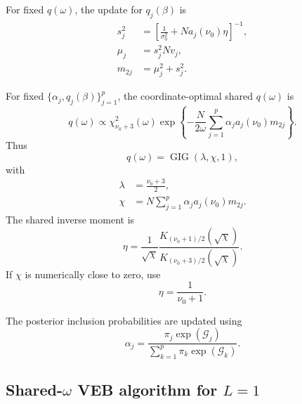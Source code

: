 \documentclass[11pt]{article}
\newcommand{\nuo}{\nu_0}
\newcommand{\sigb}{\sigma_0^2}
\newcommand{\GIG}{\operatorname{GIG}}
\newcommand{\chisq}{\chi^2}
\begin{document}
For fixed \(q(\omega)\), the update for \(q_j(\beta)\) is
\begin{align}
s_j^2
&=
\left[
\frac{1}{\sigb}
+
N a_j(\nuo)\eta
\right]^{-1},
\\
\mu_j
&=
s_j^2Nv_j,
\\
m_{2j}
&=
\mu_j^2+s_j^2.
\end{align}

For fixed \(\{\alpha_j,q_j(\beta)\}_{j=1}^p\), the coordinate-optimal shared \(q(\omega)\) is
\[
q(\omega)
\propto
\chisq_{\nuo+3}(\omega)
\exp\left\{
-
\frac{N}{2\omega}
\sum_{j=1}^p
\alpha_j a_j(\nuo)m_{2j}
\right\}.
\]
Thus
\[
q(\omega)
=
\GIG(\lambda,\chi,1),
\]
with
\begin{align}
\lambda
&=
\frac{\nuo+3}{2},
\\
\chi
&=
N
\sum_{j=1}^p
\alpha_j a_j(\nuo)m_{2j}.
\end{align}
The shared inverse moment is
\[
\eta
=
\frac{1}{\sqrt{\chi}}
\frac{
K_{(\nuo+1)/2}(\sqrt{\chi})
}{
K_{(\nuo+3)/2}(\sqrt{\chi})
}.
\]
If \(\chi\) is numerically close to zero, use
\[
\eta=\frac{1}{\nuo+1}.
\]

The posterior inclusion probabilities are updated using
\[
\alpha_j
=
\frac{
\pi_j\exp(\mathcal G_j)
}{
\sum_{k=1}^p
\pi_k\exp(\mathcal G_k)
}.
\]

\subsection*{Shared-\(\omega\) VEB algorithm for \(L=1\)}
\end{document}
